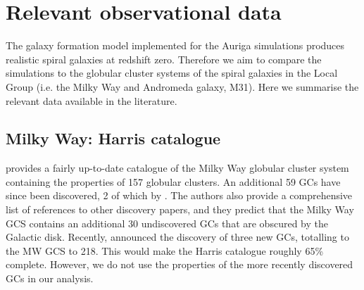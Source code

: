 \documentclass[a4paper,fleqn,usenatbib]{mnras}
\begin{document}


% 
% 



\section{Relevant observational data}
\label{sec:observations}
The galaxy formation model implemented for the Auriga simulations produces
realistic spiral galaxies at redshift zero. Therefore we aim to compare the
simulations to the globular cluster systems of the spiral galaxies in the 
Local Group (i.e. the Milky Way and Andromeda galaxy, M31). Here we summarise 
the relevant data available in the literature.

\subsection{Milky Way: Harris catalogue}
\label{sec:harris}
\citet[][2010 edition; hereafter H96]{1996AJ....112.1487H} provides a fairly
up-to-date catalogue of the Milky Way globular cluster system containing the
properties of 157 globular clusters. An additional 59 GCs have since been 
discovered, 2 of which by \citet{2018ApJ...863L..38R}. The authors also provide 
a comprehensive list of references to other discovery papers, and they predict 
that the Milky Way GCS contains an additional 30 undiscovered GCs that are 
obscured by the Galactic disk. Recently, \citet{2019arXiv190108574C} announced
the discovery of three new GCs, totalling to the MW GCS to 218. This would make
the Harris catalogue roughly 65\% complete. However, we do not use the properties 
of the more recently discovered GCs in our analysis.
\end{document}

